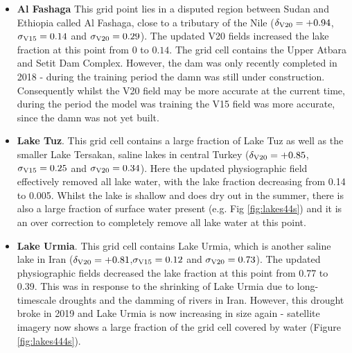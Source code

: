 \documentclass[hess, twostagejnl]{copernicus}
\begin{document}
\begin{itemize}
	\item \textbf{Al Fashaga} This grid point lies in a disputed region between Sudan and Ethiopia called Al Fashaga, close to a tributary of the Nile ($\delta_{\rm V20} = +0.94$,$\sigma_{\rm V15} = 0.14$ and $\sigma_{\rm V20}=0.29$). The updated V20 fields increased the lake fraction at this point from $0$ to $0.14$. The grid cell contains the Upper Atbara and Setit Dam Complex. However, the dam was only recently completed in 2018 - during the training period the damn was still under construction. Consequently whilst the V20 field may be more accurate at the current time, during the period the model was training the V15 field was more accurate, since the damn was not yet built. 
		
	\item \textbf{Lake Tuz}. This grid cell contains a large fraction of Lake Tuz as well as the smaller Lake Tersakan, saline lakes in central Turkey ($\delta_{\rm V20} = +0.85$,$\sigma_{\rm V15} = 0.25$ and $\sigma_{\rm V20}=0.34$). Here the updated physiographic field effectively removed all lake water, with the lake fraction decreasing from 0.14 to 0.005. Whilst the lake is shallow and does dry out in the summer, there is also a large fraction of surface water present (e.g. Fig \ref{fig:lakes44s}) and it is an over correction to completely remove all lake water at this point.
	
	\item \textbf{Lake Urmia}. This grid cell contains Lake Urmia, which is another saline lake in Iran ($\delta_{\rm V20} = +0.81$,$\sigma_{\rm V15} = 0.12$ and $\sigma_{\rm V20}=0.73$). The updated physiographic fields decreased the lake fraction at this point from 0.77 to 0.39. This was in response to the shrinking of Lake Urmia due to long-timescale droughts and the damming of rivers in Iran. However, this drought broke in 2019 and Lake Urmia is now increasing in size again - satellite imagery now shows a large fraction of the grid cell covered by water (Figure \ref{fig:lakes444s}).
\end{itemize}
\end{document}
